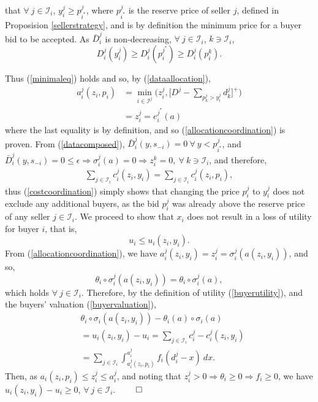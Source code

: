\documentclass[sigconf, anonymous]{acmart}
\newcommand{\mcI}{\mathcal{I}}
\newcommand{\g}{\sigma}
\theoremstyle{definition}
\begin{document}
that $\forall \ j\in\mcI_i$, $y_i^j \ge p_{i^*}^j$, where $p_{i^*}^j$ is the reserve price of seller $j$, defined in Proposision
\ref{sellerstrategy}, and is by definition the minimum price for a buyer bid to
be accepted. 
As $\bar{D}_i^j$ is non-decreasing, $\forall \ j\in \mcI_i$,
$k\ni\mcI_i$,
$$
    D_i^j(y_i^j) \ge D_i^j(p_i^{j^*})\ge D_i^j(p_i^{k}).
$$
\iffalse
Furthermore, suppose there exists buyer $k\in \mcI^j$, such that
$\g_k^{j^*}(a) \ge \g_i^{j^*}(a)$ and $D^j - \sum_{k\in\mcI^j,k\ne i}d_k^j < z_i^{j}$, resulting in a
partial allocation. Bid $s_k^j \in s_{-i}$, and so is considered in buyer $i$'s strategy. 
As buyer $i$ is allowed to choose subset $\mcI_i$, and $\mcI_i$ is a minimal
set, (\ref{buyercoordinate}) states that $n$ is such that $\g_i^{j*}(a)
\ge \g_k^{j^*}(a)$ for any $k\in\mcI$, therefore such a buyer $k$ cannot exist.
We have, $\forall \ j\in \mcI_i$, $k\ni\mcI_i$,
$$
    {\theta_i}'(e_i^{k}(a)) \ge {\theta_i}'(e_i^{j^*}(a)) \ge y_i^j.
$$
Now, suppose that $p_k^j = p_i^j$, however $d_k^j > d_i^j$...
\fi
Thus (\ref{minimaleq}) holds and so, by (\ref{dataallocation}),
\begin{align*}
     a_i^j(z_i,p_i) &=\min_{i\in\mcI^j}\bigg(z_i^j, \bigg\lbrack D^{j} - \sum_{p_k^{j}> y_i^{j}}
d_k^{j}\bigg\rbrack^+\bigg) \\
    &= z_i^{j}= e_i^{j^*}(a)
\end{align*}
where the last equality is by definition, and so (\ref{allocationcoordination}) is proven.
From (\ref{datacomposed}), $\bar{D}_i^j(y, s_{-i}) =
0 \ \forall \ y < p_{i^*}^j$, and $\bar{D}_i^j(y, s_{-i}) =0 \le \epsilon
\Rightarrow \g_i^j(a) = 0 \Rightarrow z_i^k = 0, \ \forall \ k \ni \mcI_i$, and therefore,
\begin{align*}
    \displaystyle\sum_{j\in\mcI_i} c_i^j(z_i,y_i) =\sum_{j\in\mcI_i}
c_i^j(z_i,p_i),
\end{align*}
thus (\ref{costcoordination}) simply shows that changing the price $p^j_i$ to $y^j_i$ does not exclude any
additional buyers, as the bid $p^j_i$ was already above the reserve price of any
seller $j \in \mcI_i$.
We proceed to show that $x_i$ does not result in a loss of utility for
buyer $i$, that is,
$$
    u_i \le u_i(z_i,y_i).
$$
From (\ref{allocationcoordination}), we have $a_i^{j}(z_i,y_i) = z_i^{j} = \g_i^j(a(z_i,y_i))$, 
and so,
$$
    \theta_i\circ \g_i^j(a(z_i,y_i)) = \theta_i\circ \g_i^j(a),
$$ 
which holds $\forall \ j\in\mcI_i$.
Therefore, by the definition of utility (\ref{buyerutility}),
and the buyers' valuation (\ref{buyervaluation}), 
\begin{align*}
    &\theta_i\circ \g_i(a(z_i,y_i)) - \theta_i(a)\circ \g_i(a) \\
    &= u_i(z_i,y_i) - u_i =  \displaystyle\sum_{j\in\mcI_i} c_i^j -c_i^{j}(z_i,y_i)\\
    &= \sum_{j\in\mcI_i}\int_{a_i^j(z_i,p_i)}^{a_i^j} f_i(d_i^j - x) \ dx.
\end{align*}
Then, as $a_i(z_i,p_i) \le z_i^j \le a_i^j $, and noting that
$z_i^j>0\Rightarrow \theta_i\ge 0\Rightarrow f_i\ge 0$, we have $u_i(z_i,y_i) - u_i \ge 0$, $\forall \ j\in\mcI_i$.
$\qed$
\end{document}
